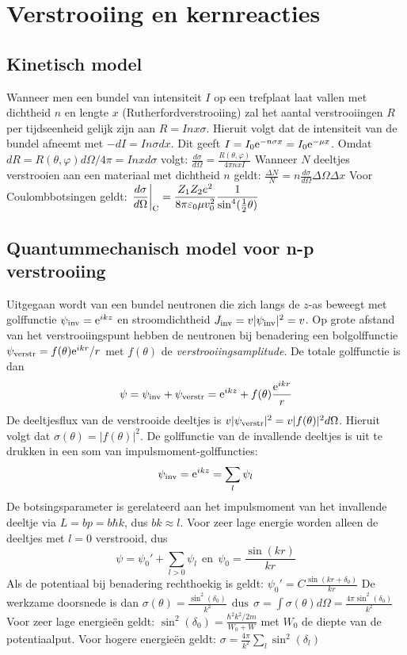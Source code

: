 \section{Verstrooiing en kernreacties}
\subsection{Kinetisch model}
Wanneer men een bundel van intensiteit $I$ op een trefplaat laat vallen
met dichtheid $n$ en lengte $x$ (Rutherfordverstrooiing) zal het aantal
verstrooiingen $R$ per tijdseenheid gelijk zijn aan $R=Inx\sigma$. Hieruit
volgt dat de intensiteit van de bundel afneemt met $-dI=In\sigma dx$. Dit
geeft $I=I_0{\rm e}^{-n\sigma x}=I_0{\rm e}^{-\mu x}$.
\npar
Omdat $dR=R(\theta,\varphi)d\Omega/4\pi=Inxd\sigma$ volgt:
$\displaystyle\frac{d\sigma}{d\Omega}=\frac{R(\theta,\varphi)}{4\pi nxI}$
\npar
Wanneer $N$ deeltjes verstrooien aan een materiaal met dichtheid $n$
geldt:
$\displaystyle\frac{\Delta N}{N}=n\frac{d\sigma}{d\Omega}\Delta\Omega\Delta x$
\npar
Voor Coulombbotsingen geldt:
$\displaystyle\left.\frac{d\sigma}{d\Omega}\right|_{\rm C}=
\frac{Z_1Z_2e^2}{8\pi\varepsilon_0\mu v_0^2}\frac{1}{\sin^4(\mbox{$\frac{1}{2}$}\theta)}$

\subsection{Quantummechanisch model voor n-p verstrooiing}
Uitgegaan wordt van een bundel neutronen die zich langs de $z$-as beweegt met
golffunctie $\psi_{\rm inv}={\rm e}^{ikz}$ en stroomdichtheid
$J_{\rm inv}=v|\psi_{\rm inv}|^2=v$. Op grote afstand van het
verstrooiingspunt hebben de neutronen bij benadering een bolgolffunctie
$\psi_{\rm verstr}=f(\theta){\rm e}^{ikr}/r$ met $f(\theta)$ de
{\it verstrooiingsamplitude}. De totale golffunctie is dan
\[
\psi=\psi_{\rm inv}+\psi_{\rm verstr}={\rm e}^{ikz}+f(\theta)\frac{{\rm e}^{ikr}}{r}
\]
De deeltjesflux van de verstrooide deeltjes
is $v|\psi_{\rm verstr}|^2=v|f(\theta)|^2 d\Omega$. Hieruit volgt dat
$\sigma(\theta)=|f(\theta)|^2$. De golffunctie van de invallende deeltjes is
uit te drukken in een som van impulsmoment-golffuncties:
\[
\psi_{\rm inv}={\rm e}^{ikz}=\sum_l\psi_l
\]
De botsingsparameter is gerelateerd aan het
impulsmoment van het invallende deeltje via $L=bp=b\hbar k$, dus $bk\approx l$.
Voor zeer lage energie worden alleen de deeltjes met $l=0$ verstrooid, dus
\[
\psi=\psi_0'+\sum_{l>0}\psi_l~~\mbox{en}~~\psi_0=\frac{\sin(kr)}{kr}
\]
Als de potentiaal bij benadering rechthoekig is geldt:
$\displaystyle\psi_0'=C\frac{\sin(kr+\delta_0)}{kr}$
\npar
De werkzame doorsnede is dan
$\displaystyle
\sigma(\theta)=\frac{\sin^2(\delta_0)}{k^2}~~\mbox{dus}~~
\sigma=\int\sigma(\theta)d\Omega=\frac{4\pi\sin^2(\delta_0)}{k^2}$
\npar
Voor zeer lage energie\"en geldt:
$\displaystyle\sin^2(\delta_0)=\frac{\hbar^2k^2/2m}{W_0+W}$
\npar
met $W_0$ de diepte van de potentiaalput. Voor hogere energie\"en geldt:
$\displaystyle\sigma=\frac{4\pi}{k^2}\sum_l\sin^2(\delta_l)$

